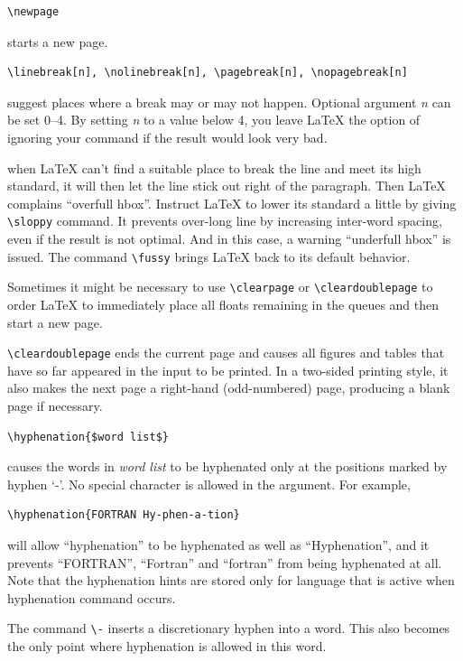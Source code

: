 \documentclass[a4paper,oneside]{book}
\newcommand{\argument}[1]{\textit{#1}}
\begin{document}
\begin{lstlisting}
\newpage
\end{lstlisting}
starts a new page.

\begin{lstlisting}
\linebreak[n], \nolinebreak[n], \pagebreak[n], \nopagebreak[n]
\end{lstlisting}
suggest places where a break may or may not happen. Optional argument \argument{n} can be set  0--4. By setting \argument{n} to a value below 4, you leave \LaTeX{} the option of ignoring your command if the result would look very bad.

when \LaTeX{} can't find a suitable place to break the line and meet its high standard, it will then let the line stick out right of the paragraph.
Then \LaTeX{} complains ``overfull hbox''. Instruct \LaTeX{} to lower its standard a little by giving \verb|\sloppy| command. It prevents over-long line by increasing inter-word spacing, even if the result is not optimal.
And in this case, a warning ``underfull hbox'' is issued. The command \verb|\fussy| brings \LaTeX{} back to its default behavior.

Sometimes it might be necessary to use \verb|\clearpage| or \verb|\cleardoublepage| to order \LaTeX{} to immediately place all floats remaining in the queues and then start a new page.

\verb|\cleardoublepage| ends the current page and causes all figures and tables that have so far appeared in the input to be printed. In a two-sided printing style, it also makes the next page a right-hand (odd-numbered) page, producing a blank page if necessary.

\begin{lstlisting}
\hyphenation{$word list$}
\end{lstlisting}
causes the words in \argument{word list} to be hyphenated only at the positions marked by hyphen `-'. No special character is allowed in the argument. For example,
\begin{lstlisting}
\hyphenation{FORTRAN Hy-phen-a-tion}
\end{lstlisting}
will allow ``hyphenation'' to be hyphenated as well as ``Hyphenation'', and it prevents ``FORTRAN'', ``Fortran'' and ``fortran'' from being hyphenated at all.
Note that the hyphenation hints are stored only for language that is active when hyphenation command occurs.

The command \verb|\-| inserts a discretionary hyphen into a word. This also becomes the only point where hyphenation is allowed in this word.
\end{document}
